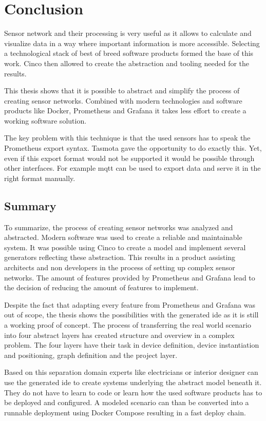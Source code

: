 \chapter{Conclusion}
\label{chapter:conclusion}
Sensor network and their processing is very useful as it allows to calculate and visualize data in a way where important information is more accessible. Selecting a technological stack of best of breed software products formed the base of this work. Cinco then allowed to create the abstraction and tooling needed for the results.

This thesis shows that it is possible to abstract and simplify the process of creating sensor networks. Combined with modern technologies and software products like Docker, Prometheus and Grafana it takes less effort to create a working software solution. 

The key problem with this technique is that the used sensors has to speak the Prometheus export syntax. Tasmota gave the opportunity to do exactly this. Yet, even if this export format would not be supported it would be possible through other interfaces. For example \gls{mqtt} can be used to export data and serve it in the right format manually. 

\section{Summary}
To summarize, the process of creating sensor networks was analyzed and abstracted. Modern software was used to create a reliable and maintainable system. It was possible using Cinco to create a model and implement several generators reflecting these abstraction. This results in a product assisting architects and non developers in the process of setting up complex sensor networks. The amount of features provided by Prometheus and Grafana lead to the decision of reducing the amount of features to implement. 

Despite the fact that adapting every feature from Prometheus and Grafana was out of scope, the thesis shows the possibilities with the generated \gls{ide} as it is still a working proof of concept. The process of transferring the real world scenario into four abstract layers has created structure and overview in a complex problem. The four layers have their task in device definition, device instantiation and positioning, graph definition and the project layer. 

Based on this separation domain experts like electricians or interior designer can use the generated \gls{ide} to create systems underlying the abstract model beneath it. They do not have to learn to code or learn how the used software products has to be deployed and configured. A modeled scenario can than be converted into a runnable deployment using Docker Compose resulting in a fast deploy chain.

